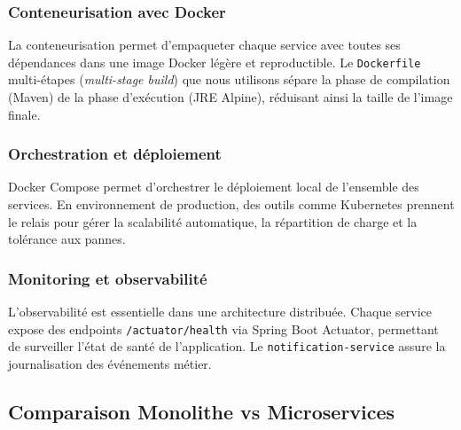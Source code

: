 \documentclass[12pt,a4paper]{article}
\begin{document}
\subsubsection{Conteneurisation avec Docker}

La conteneurisation permet d'empaqueter chaque service avec toutes ses dépendances dans une image Docker légère et reproductible. Le \texttt{Dockerfile} multi-étapes (\textit{multi-stage build}) que nous utilisons sépare la phase de compilation (Maven) de la phase d'exécution (JRE Alpine), réduisant ainsi la taille de l'image finale.

\subsubsection{Orchestration et déploiement}

Docker Compose permet d'orchestrer le déploiement local de l'ensemble des services. En environnement de production, des outils comme Kubernetes prennent le relais pour gérer la scalabilité automatique, la répartition de charge et la tolérance aux pannes.

\subsubsection{Monitoring et observabilité}

L'observabilité est essentielle dans une architecture distribuée. Chaque service expose des endpoints \texttt{/actuator/health} via Spring Boot Actuator, permettant de surveiller l'état de santé de l'application. Le \texttt{notification-service} assure la journalisation des événements métier.

\subsection{Comparaison Monolithe vs Microservices}
\end{document}
